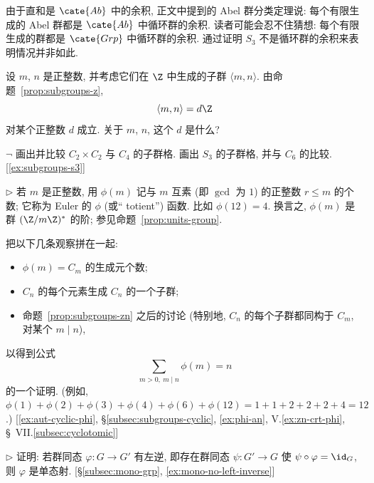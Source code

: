 \begin{prob}
\label{ex:cyclic-coproduct-conj}
由于直和是 $\cate{Ab}$ 中的余积, 正文中提到的 Abel 群分类定理说: 每个有限生成的 Abel 群都是 $\cate{Ab}$ 中循环群的余积. 读者可能会忍不住猜想: 每个有限生成的群都是 $\cate{Grp}$ 中循环群的余积. 通过证明 $S_3$ 不是循环群的余积来表明情况并非如此.
\end{prob}

\begin{prob}
\label{ex:mn-subgroup}
设 $m$, $n$ 是正整数, 并考虑它们在 $\Z$ 中生成的子群 $\langle m, n \rangle$. 由命题~\ref{prop:subgroups-z},
\[
\langle m, n \rangle = d\Z
\]
对某个正整数 $d$ 成立. 关于 $m$, $n$, 这个 $d$ 是什么?
\end{prob}

\begin{prob}
\label{ex:lattices-c2c2}
$\neg$ 画出并比较 $C_2 \times C_2$ 与 $C_4$ 的子群格. 画出 $S_3$ 的子群格, 并与 $C_6$ 的比较. [\ref{ex:subgroups-s3}]
\end{prob}

\begin{prob}
\label{ex:euler-phi-sum}
$\triangleright$ 若 $m$ 是正整数, 用 $\phi(m)$ 记与 $m$ 互素 (即 $\gcd$ 为 $1$) 的正整数 $r \leq m$ 的个数; 它称为 Euler 的 $\phi$ (或`` totient'') 函数. 比如 $\phi(12) = 4$. 换言之, $\phi(m)$ 是群 $(\Z/m\Z)^{*}$ 的阶; 参见命题~\ref{prop:units-group}.

把以下几条观察拼在一起:
\begin{itemize}
	\item $\phi(m) = C_m$ 的生成元个数;
	\item $C_n$ 的每个元素生成 $C_n$ 的一个子群;
	\item 命题~\ref{prop:subgroups-zn} 之后的讨论 (特别地, $C_n$ 的每个子群都同构于 $C_m$, 对某个 $m \mid n$),
\end{itemize}
以得到公式
\[
\sum_{m > 0,\ m \mid n} \phi(m) = n
\]
的一个证明. (例如, $\phi(1) + \phi(2) + \phi(3) + \phi(4) + \phi(6) + \phi(12) = 1 + 1 + 2 + 2 + 2 + 4 = 12$.) [\ref{ex:aut-cyclic-phi}, \S\ref{subsec:subgroups-cyclic}, \ref{ex:phi-an}, V.\ref{ex:zn-crt-phi}, \S~VII.\ref{subsec:cyclotomic}]
\end{prob}

\begin{prob}
\label{ex:left-inverse-mono}
$\triangleright$ 证明: 若群同态 $\varphi : G \to G'$ 有左逆, 即存在群同态 $\psi : G' \to G$ 使 $\psi \circ \varphi = \id_G$, 则 $\varphi$ 是单态射. [\S\ref{subsec:mono-grp}, \ref{ex:mono-no-left-inverse}]
\end{prob}

